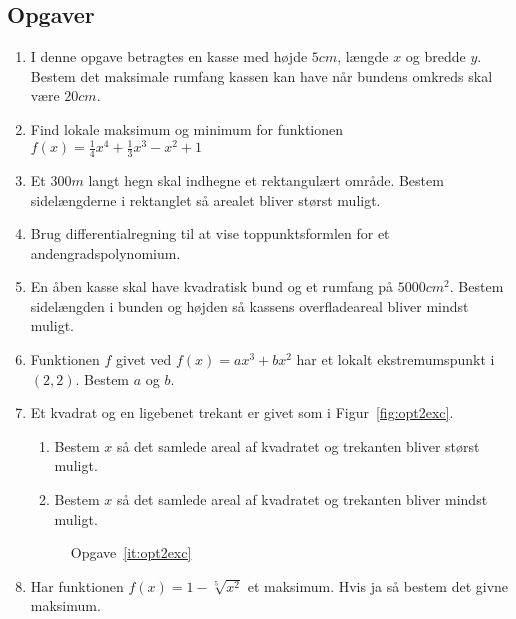 \subsection{Opgaver}

\begin{enumerate}
	
	
	\item I denne opgave betragtes en kasse med højde $5cm$, længde $x$ og bredde $y$. Bestem det maksimale rumfang kassen kan have når bundens omkreds skal være $20cm$. 
	
	\item Find lokale maksimum og minimum for funktionen $f(x)=\frac{1}{4}x^4+\frac{1}{3}x^3-x^2+1$
	
	\item Et $ 300m $ langt hegn skal indhegne et rektangulært område. Bestem sidelængderne i rektanglet så arealet bliver størst muligt. 
	
	\item Brug differentialregning til at vise toppunktsformlen for et andengradspolynomium.
	
	\item En åben kasse skal have kvadratisk bund og et rumfang på $ 5000 cm^2 $. Bestem sidelængden i bunden og højden så kassens overfladeareal bliver mindst muligt.
	
	\item Funktionen $f$ givet ved $f(x)=ax^3+bx^2$ har et lokalt ekstremumspunkt i $(2,2)$. Bestem $a$ og $b$.
		
	\item \label{it:opt2exc} Et kvadrat og en ligebenet trekant er givet som i Figur~\ref{fig:opt2exc}.
	\begin{enumerate}
		\item Bestem $x$ så det samlede areal af kvadratet og trekanten bliver størst muligt.
		\item Bestem $x$ så det samlede areal af kvadratet og trekanten bliver mindst muligt.
	\end{enumerate}
	
		\begin{figure}
		\centering
		\caption{Opgave~\ref{it:opt2exc}}
		\label{fig:opt2ëxc}
	\end{figure} 
	
	\item Har funktionen $f(x)=1-\sqrt[5]{x^2}$ et maksimum. Hvis ja så bestem det givne maksimum.
	


\end{enumerate}
